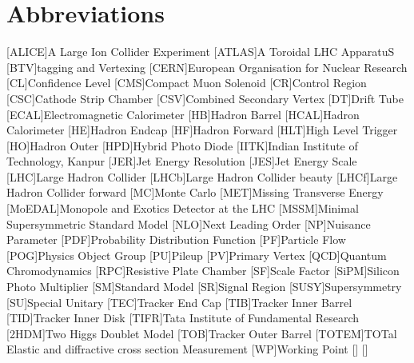\chapter {Abbreviations}
\begin{center}
\begin{acronym}
        [ALICE]{A Large Ion Collider Experiment}
        [ATLAS]A Toroidal LHC ApparatuS{}
        [BTV]{\PQb tagging and Vertexing}
        [CERN]{European Organisation for Nuclear Research}
        [CL]{Confidence Level}
        [CMS]{Compact Muon Solenoid}
        [CR]{Control Region}
        [CSC]{Cathode Strip Chamber}
        [CSV]{Combined Secondary Vertex}
        [DT]{Drift Tube}
        [ECAL]{Electromagnetic Calorimeter}
        [HB]{Hadron Barrel}
        [HCAL]{Hadron Calorimeter}
        [HE]{Hadron Endcap}
        [HF]{Hadron Forward}
        [HLT]{High Level Trigger}
        [HO]{Hadron Outer}
        [HPD]{Hybrid Photo Diode}
        [IITK]{Indian Institute of Technology, Kanpur}
        [JER]{Jet Energy Resolution}
        [JES]{Jet Energy Scale}
        [LHC]{Large Hadron Collider}
        [LHCb]{Large Hadron Collider beauty}
        [LHCf]{Large Hadron Collider forward}
        [MC]{Monte Carlo}
        [MET]{Missing Transverse Energy}
        [MoEDAL]{Monopole and Exotics Detector at the LHC}
        [MSSM]{Minimal Supersymmetric Standard Model}
        [NLO]{Next Leading Order}
        [NP]{Nuisance Parameter}
        [PDF]{Probability Distribution Function}
        [PF]{Particle Flow}
        [POG]{Physics Object Group}
        [PU]{Pileup}
        [PV]{Primary Vertex}
        [QCD]{Quantum Chromodynamics}
        [RPC]{Resistive Plate Chamber}
        [SF]{Scale Factor}
        [SiPM]{Silicon Photo Multiplier}
        [SM]{Standard Model}
        [SR]{Signal Region}
        [SUSY]{Supersymmetry}
        [SU]{Special Unitary}
        [TEC]{Tracker End Cap}
        [TIB]{Tracker Inner Barrel}
        [TID]{Tracker Inner Disk}
	[TIFR]{Tata Institute of Fundamental Research}
        [2HDM]{Two Higgs Doublet Model}
        [TOB]{Tracker Outer Barrel}
        [TOTEM]{TOTal Elastic and diffractive cross section Measurement}
        [WP]{Working Point}
        \acro{}[]{}
        \acro{}[]{}
\end{acronym}
\end{center}


